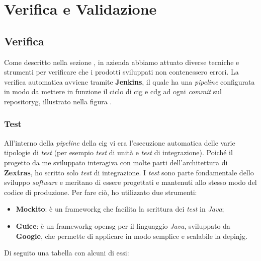 \section{Verifica e Validazione}
\subsection{Verifica}
Come descritto nella sezione , in azienda abbiamo attuato diverse tecniche e strumenti per verificare che i prodotti sviluppati non contenessero errori. La verifica automatica avviene tramite \textbf{Jenkins}, il quale ha una \textit{pipeline} configurata in modo da mettere in funzione il ciclo di \gls{cig} e \gls{cdg} ad ogni \textit{commit} sul \gls{repositoryg}, illustrato nella figura .
\subsubsection{Test}
All'interno della \textit{pipeline} della \gls{cig} vi era l'esecuzione automatica delle varie tipologie di \textit{test} (per esempio \textit{test} di unità e \textit{test} di integrazione). Poiché il progetto da me sviluppato interagiva con molte parti dell'architettura di \textbf{Zextras}, ho scritto solo \textit{test} di integrazione. I \textit{test} sono parte fondamentale dello sviluppo \textit{software} e meritano di essere progettati e mantenuti allo stesso modo del codice di produzione. Per fare ciò, ho utilizzato due strumenti:
\begin{itemize}
    \item \textbf{Mockito}: è un \gls{frameworkg} che facilita la scrittura dei \textit{test} in \textit{Java}; 
    \item \textbf{Guice}: è un \gls{frameworkg} \gls{opensg} per il linguaggio \textit{Java}, sviluppato da \textbf{Google}, che permette di applicare in modo semplice e scalabile la \gls{depinjg}.
\end{itemize}
Di seguito una tabella con alcuni di essi:

